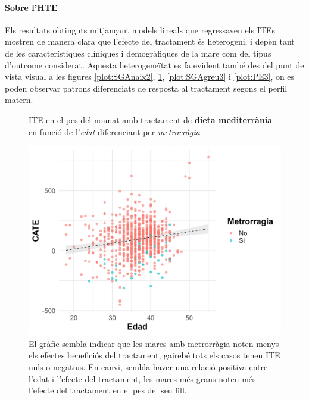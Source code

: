 \documentclass[../main.tex]{subfiles}
\begin{document}
    \paragraph{Sobre l'HTE} Els resultats obtinguts mitjançant models lineals que regressaven els ITEs mostren de manera clara que l'efecte del tractament és heterogeni, i depèn tant de les característiques clíniques i demogràfiques de la mare com del tipus d'outcome considerat. Aquesta heterogeneïtat es fa evident també des del punt de vista visual a les figures \ref{plot:SGAnaix2}, \ref{plot:peso2}, \ref{plot:SGAgreu3} i \ref{plot:PE3}, on es poden observar patrons diferenciats de resposta al tractament segons el perfil matern.
    
    \begin{figure}[H]
      \centering
      \begin{minipage}[t]{0.48\textwidth}
        \captionsetup{font=small}
        \caption*{\centering ITE en el pes del nounat amb tractament de \textbf{dieta mediterrània} en funció de l'\textit{edat} diferenciant per \textit{metrorràgia}}
        \includegraphics[width=\textwidth]{imgs/scaterplots/scater_PesoRN_2_EdadMetrorragia.jpg}
        \captionsetup{font=footnotesize}
        \caption{El gràfic sembla indicar que les mares amb metrorràgia noten menys els efectes beneficiós del tractament, gairebé tots els casos tenen ITE nuls o negatius. En canvi, sembla haver una relació positiva entre l'edat i l'efecte del tractament, les mares més grans noten més l'efecte del tractament en el pes del seu fill.}
        \label{plot:peso2}
      \end{minipage}
      \hspace{0.01\textwidth}

\end{figure}
\end{document}
